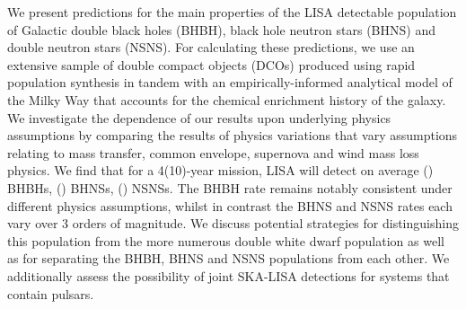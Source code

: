 We present predictions for the main properties of the LISA detectable population of Galactic double black holes (BHBH), black hole neutron stars (BHNS) and double neutron stars (NSNS). For calculating these predictions, we use an extensive sample of double compact objects (DCOs) produced using rapid population synthesis in tandem with an empirically-informed analytical model of the Milky Way that accounts for the chemical enrichment history of the galaxy. We investigate the dependence of our results upon underlying physics assumptions by comparing the results of \nModels{} physics variations that vary assumptions relating to mass transfer, common envelope, supernova and wind mass loss physics. We find that for a 4(10)-year mission, LISA will detect on average \BHBHFourYear{}(\BHBHTenYear{}) BHBHs, \BHNSFourYear{}(\BHNSTenYear{}) BHNSs, \NSNSFourYear{}(\NSNSTenYear{}) NSNSs. The BHBH rate remains notably consistent under different physics assumptions, whilst in contrast the BHNS and NSNS rates each vary over 3 orders of magnitude. We discuss potential strategies for distinguishing this population from the more numerous double white dwarf population as well as for separating the BHBH, BHNS and NSNS populations from each other. We additionally assess the possibility of joint SKA-LISA detections for systems that contain pulsars.